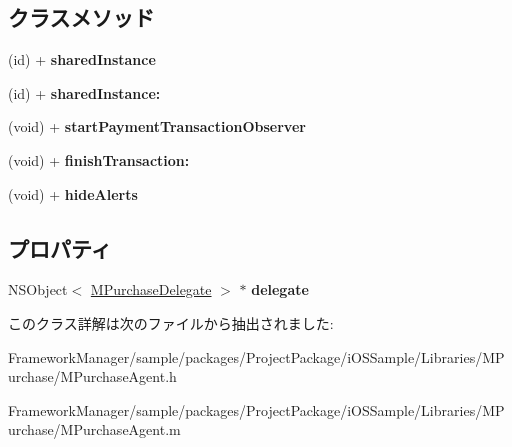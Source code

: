 \subsection*{クラスメソッド}
\begin{DoxyCompactItemize}
\item 
\hypertarget{interface_m_purchase_agent_a815ffc7c2a191ac245ee107edbf17077}{}(id) + {\bfseries shared\+Instance}\label{interface_m_purchase_agent_a815ffc7c2a191ac245ee107edbf17077}

\item 
\hypertarget{interface_m_purchase_agent_a5713829a8b827953c605602438eb4991}{}(id) + {\bfseries shared\+Instance\+:}\label{interface_m_purchase_agent_a5713829a8b827953c605602438eb4991}

\item 
\hypertarget{interface_m_purchase_agent_a577064ab7c7e23299635f5666a5cfd1c}{}(void) + {\bfseries start\+Payment\+Transaction\+Observer}\label{interface_m_purchase_agent_a577064ab7c7e23299635f5666a5cfd1c}

\item 
\hypertarget{interface_m_purchase_agent_a3fe184124ae469427a544cfa61f497a3}{}(void) + {\bfseries finish\+Transaction\+:}\label{interface_m_purchase_agent_a3fe184124ae469427a544cfa61f497a3}

\item 
\hypertarget{interface_m_purchase_agent_a8542e17c2553040bf58a9ac682b21255}{}(void) + {\bfseries hide\+Alerts}\label{interface_m_purchase_agent_a8542e17c2553040bf58a9ac682b21255}

\end{DoxyCompactItemize}
\subsection*{プロパティ}
\begin{DoxyCompactItemize}
\item 
\hypertarget{interface_m_purchase_agent_a18e1026625011b683551101adaf5c1c0}{}N\+S\+Object$<$ \hyperlink{protocol_m_purchase_delegate-p}{M\+Purchase\+Delegate} $>$ $\ast$ {\bfseries delegate}\label{interface_m_purchase_agent_a18e1026625011b683551101adaf5c1c0}

\end{DoxyCompactItemize}


このクラス詳解は次のファイルから抽出されました\+:\begin{DoxyCompactItemize}
\item 
Framework\+Manager/sample/packages/\+Project\+Package/i\+O\+S\+Sample/\+Libraries/\+M\+Purchase/M\+Purchase\+Agent.\+h\item 
Framework\+Manager/sample/packages/\+Project\+Package/i\+O\+S\+Sample/\+Libraries/\+M\+Purchase/M\+Purchase\+Agent.\+m\end{DoxyCompactItemize}
